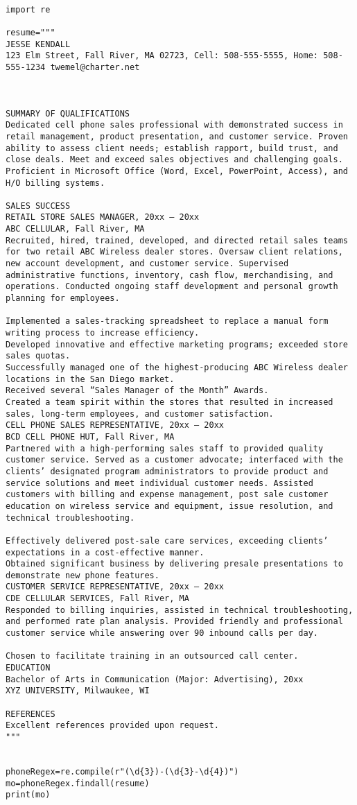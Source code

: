 \documentclass[11pt]{article}
\begin{document}
\begin{verbatim}

import re

resume="""
JESSE KENDALL
123 Elm Street, Fall River, MA 02723, Cell: 508-555-5555, Home: 508-555-1234 twemel@charter.net



SUMMARY OF QUALIFICATIONS
Dedicated cell phone sales professional with demonstrated success in retail management, product presentation, and customer service. Proven ability to assess client needs; establish rapport, build trust, and close deals. Meet and exceed sales objectives and challenging goals. Proficient in Microsoft Office (Word, Excel, PowerPoint, Access), and H/O billing systems.

SALES SUCCESS
RETAIL STORE SALES MANAGER, 20xx – 20xx
ABC CELLULAR, Fall River, MA
Recruited, hired, trained, developed, and directed retail sales teams for two retail ABC Wireless dealer stores. Oversaw client relations, new account development, and customer service. Supervised administrative functions, inventory, cash flow, merchandising, and operations. Conducted ongoing staff development and personal growth planning for employees.

Implemented a sales-tracking spreadsheet to replace a manual form writing process to increase efficiency.
Developed innovative and effective marketing programs; exceeded store sales quotas.
Successfully managed one of the highest-producing ABC Wireless dealer locations in the San Diego market.
Received several “Sales Manager of the Month” Awards.
Created a team spirit within the stores that resulted in increased sales, long-term employees, and customer satisfaction.
CELL PHONE SALES REPRESENTATIVE, 20xx – 20xx
BCD CELL PHONE HUT, Fall River, MA
Partnered with a high-performing sales staff to provided quality customer service. Served as a customer advocate; interfaced with the clients’ designated program administrators to provide product and service solutions and meet individual customer needs. Assisted customers with billing and expense management, post sale customer education on wireless service and equipment, issue resolution, and technical troubleshooting.

Effectively delivered post-sale care services, exceeding clients’ expectations in a cost-effective manner.
Obtained significant business by delivering presale presentations to demonstrate new phone features.
CUSTOMER SERVICE REPRESENTATIVE, 20xx – 20xx
CDE CELLULAR SERVICES, Fall River, MA
Responded to billing inquiries, assisted in technical troubleshooting, and performed rate plan analysis. Provided friendly and professional customer service while answering over 90 inbound calls per day.

Chosen to facilitate training in an outsourced call center.
EDUCATION
Bachelor of Arts in Communication (Major: Advertising), 20xx
XYZ UNIVERSITY, Milwaukee, WI

REFERENCES
Excellent references provided upon request.
"""


phoneRegex=re.compile(r"(\d{3})-(\d{3}-\d{4})")
mo=phoneRegex.findall(resume)
print(mo)

\end{verbatim}
\end{document}
